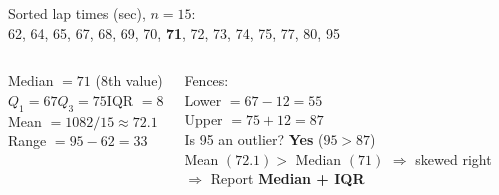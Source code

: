 \documentclass[aspectratio=169, 11pt]{beamer}
\begin{document}
{
\begin{frame}[t, plain]
  \vspace{1em}%
  \hspace{0.55cm}%
  \begin{minipage}{0.9\textwidth}
    \small
    Sorted lap times (sec), $n = 15$:\\
    62, 64, 65, 67, 68, 69, 70, \textbf{71}, 72, 73, 74, 75, 77, 80, 95

    \vspace{0.4cm}
    \begin{columns}[t]
        Median $= 71$ (8th value)\\[4pt]
        $Q_1 = 67$\quad $Q_3 = 75$\quad IQR $= 8$\\[4pt]
        Mean $= 1082 / 15 \approx 72.1$\\[4pt]
        Range $= 95 - 62 = 33$

        Fences:\\
        Lower $= 67 - 12 = 55$\\
        Upper $= 75 + 12 = 87$\\[4pt]
        Is 95 an outlier? \textbf{Yes} ($95 > 87$)\\[4pt]
        Mean $(72.1) >$ Median $(71)$ $\Rightarrow$ skewed right\\[4pt]
        $\Rightarrow$ Report \textbf{Median + IQR}
    \end{columns}
  \end{minipage}
\end{frame}
}
\end{document}
